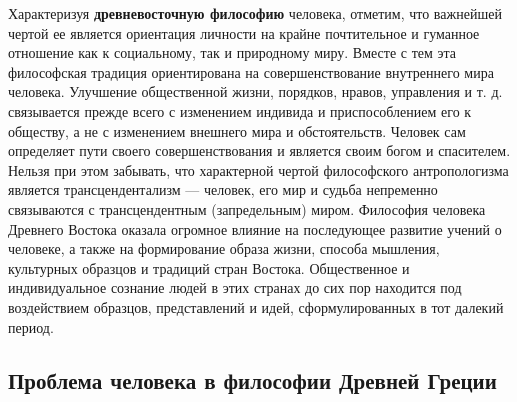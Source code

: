 \documentclass[12pt]{article}
\begin{document}
Характеризуя \textbf{древневосточную философию} человека, отметим, что важнейшей чертой ее является ориентация
личности на крайне почтительное и гуманное отношение как к социальному, так и природному миру. Вместе с
тем эта философская традиция ориентирована на совершенствование внутреннего мира человека. Улучшение
общественной жизни, порядков, нравов, управления и т. д. связывается прежде всего с изменением индивида и
приспособлением его к обществу, а не с изменением внешнего мира и обстоятельств. Человек сам определяет
пути  своего  совершенствования  и  является  своим  богом  и  спасителем.  Нельзя  при  этом  забывать,  что
характерной чертой философского антропологизма является трансцендентализм — человек, его мир и судьба
непременно связываются с трансцендентным (запредельным) миром.
Философия человека Древнего Востока оказала огромное влияние на последующее развитие учений о человеке,
а также на формирование образа жизни, способа мышления, культурных образцов и традиций стран Востока.
Общественное и  индивидуальное сознание  людей в этих странах до  сих  пор находится под  воздействием
образцов, представлений и идей, сформулированных в тот далекий период.

\subsection{Проблема человека в философии Древней Греции}
\end{document}
